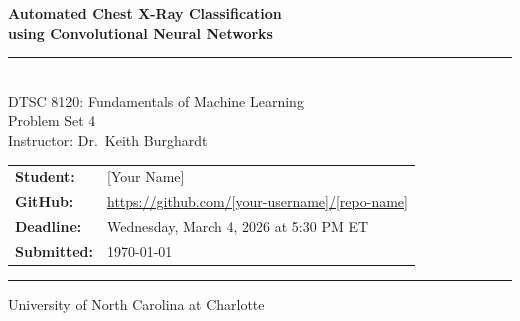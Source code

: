 \documentclass[11pt, letterpaper]{article}
\begin{document}
\begin{titlepage}
  \centering\vspace*{2cm}
  {\LARGE\bfseries Automated Chest X-Ray Classification\\[0.5em]
   \large using Convolutional Neural Networks\\[2em]}
  \rule{\linewidth}{0.5pt}\\[1em]
  {\large DTSC 8120: Fundamentals of Machine Learning\\
   Problem Set 4\\[1em]
   Instructor: Dr.\ Keith Burghardt\\[2em]}
  \begin{tabular}{ll}
    \textbf{Student:}  & [Your Name] \\
    \textbf{GitHub:}   & \url{https://github.com/[your-username]/[repo-name]} \\
    \textbf{Deadline:} & Wednesday, March 4, 2026 at 5:30 PM ET \\
    \textbf{Submitted:}& \today \\
  \end{tabular}
  \vspace{2em}\rule{\linewidth}{0.5pt}
  \vfill{\small University of North Carolina at Charlotte}
\end{titlepage}

\begin{abstract}
We develop and evaluate Convolutional Neural Network (CNN) classifiers to
automatically sort chest X-rays into three clinical categories: healthy (Class 0),
pre-existing conditions such as aortic enlargement, cardiomegaly, or pulmonary
fibrosis (Class 1), and urgent conditions requiring immediate attention such as
pleural effusion (Class 2). The training dataset of 11{,}414 images exhibits
severe class imbalance (92\% healthy), addressed via inverse-frequency class
weights, balanced batch sampling, and data augmentation. We train three
architectures: a 3-block Baseline CNN, a 4-block Residual CNN, and a
transfer-learning ResNet18. All models are trained on a single NVIDIA H200 NVL
GPU (139~GB). The best model (ResNet18) achieves a macro-F1 of \textbf{0.709}
on the internal test set and \textbf{0.723} on the external Kaggle benchmark.
Code is available at the GitHub link above.
\end{abstract}

\tableofcontents
\newpage
\end{document}
